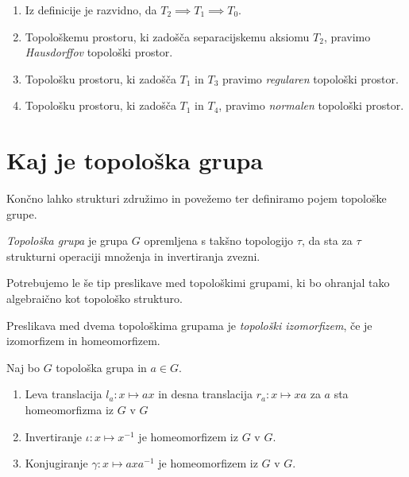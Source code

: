 \documentclass[mat1]{fmfdelo}
\begin{document}
\begin{opomba}
	\begin{enumerate}
		\item Iz definicije je razvidno, da $T_2 \implies T_1 \implies T_0$.
		\item Topološkemu prostoru, ki zadošča separacijskemu aksiomu $T_2$, pravimo \emph{Hausdorffov} topološki prostor.
		\item Topološku prostoru, ki zadošča $T_1$ in $T_3$ pravimo \emph{regularen} topološki prostor.
		\item Topološku prostoru, ki zadošča $T_1$ in $T_4$, pravimo \emph{normalen} topološki prostor.
	\end{enumerate}
\end{opomba}

\section{Kaj je topološka grupa}


Končno lahko strukturi združimo in povežemo ter definiramo pojem topološke grupe.
\begin{definicija}\label{def:topgrupa}
\emph{Topološka grupa} je grupa $G$ opremljena s takšno topologijo $\tau$, da sta za $\tau$ strukturni operaciji množenja in invertiranja zvezni. 
\end{definicija}

Potrebujemo le še tip preslikave med topološkimi grupami, ki bo ohranjal tako algebraično kot topološko strukturo.
\begin{definicija}\label{def:topizo}
Preslikava med dvema topološkima grupama je \emph{topološki izomorfizem}, če je izomorfizem in homeomorfizem.
\end{definicija}


\begin{trditev}\label{trd:trans}
Naj bo $G$ topološka grupa in $a \in G$.
\begin{enumerate}
\item Leva translacija $l_a\colon x \mapsto ax$ in desna translacija $r_a\colon x \mapsto xa$ za $a$ sta homeomorfizma iz $G$ v $G$
\item Invertiranje $\iota\colon x \mapsto x^{-1}$ je homeomorfizem iz $G$ v $G$.
\item Konjugiranje $\gamma\colon x \mapsto axa^{-1}$ je homeomorfizem iz $G$ v $G$.
\end{enumerate}
\end{trditev}
\end{document}
